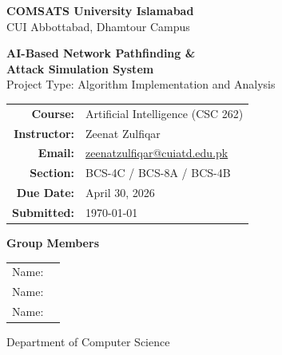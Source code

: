 \documentclass[12pt,a4paper]{article}
\begin{document}
\begin{titlepage}
    \centering
    \vspace*{0.5cm}

    {\Large \textbf{COMSATS University Islamabad}}\\[0.3cm]
    {\large CUI Abbottabad, Dhamtour Campus}\\[1.5cm]

    \begin{tcolorbox}[colback=cuiblue!10, colframe=cuiblue, width=\textwidth]
        \centering
        {\LARGE \textbf{AI-Based Network Pathfinding \&}}\\[0.3cm]
        {\LARGE \textbf{Attack Simulation System}}\\[0.5cm]
        {\large Project Type: Algorithm Implementation and Analysis}
    \end{tcolorbox}

    \vspace{1.2cm}

    \begin{tabular}{rl}
        \textbf{Course:}      & Artificial Intelligence (CSC 262) \\[0.4cm]
        \textbf{Instructor:}  & Zeenat Zulfiqar \\[0.4cm]
        \textbf{Email:}       & \href{mailto:zeenatzulfiqar@cuiatd.edu.pk}{zeenatzulfiqar@cuiatd.edu.pk} \\[0.4cm]
        \textbf{Section:}     & BCS-4C / BCS-8A / BCS-4B \\[0.4cm]
        \textbf{Due Date:}    & April 30, 2026 \\[0.4cm]
        \textbf{Submitted:}   & \today \\
    \end{tabular}

    \vspace{1.5cm}

    \begin{tcolorbox}[colback=gray!10, colframe=gray!50, width=0.65\textwidth]
        \centering
        \textbf{Group Members}\\[0.5cm]
        \begin{tabular}{ll}
            Name: & \underline{\hspace{5cm}} \\[0.5cm]
            Name: & \underline{\hspace{5cm}} \\[0.5cm]
            Name: & \underline{\hspace{5cm}} \\
        \end{tabular}
    \end{tcolorbox}

    \vfill
    {\small Department of Computer Science}
\end{titlepage}
\end{document}
